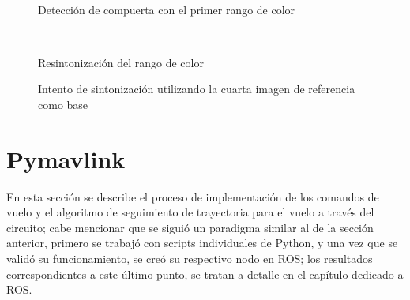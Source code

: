 \begin{figure}[ht]
    \centering
    \hfill
    \\
    \hfill
    \hfill

    \caption{Detección de compuerta con el primer rango de color}
    \label{fig:cv_gatesth1}
\end{figure}

\begin{figure}[ht]
    \centering
    \hfill
    \\
    \hfill
    \hfill

    \caption{Resintonización del rango de color}
    \label{fig:cv_gatesth2}
\end{figure}

\begin{figure}[ht]
    \centering
    \hfill

    \caption{Intento de sintonización utilizando la cuarta imagen de referencia como base}
    \label{fig:cv_gatesth3}
\end{figure}

\newpage

\section{Pymavlink}
En esta sección se describe el proceso de implementación de los comandos de vuelo y el algoritmo de seguimiento de trayectoria para el vuelo a través del circuito; cabe mencionar que se siguió un paradigma similar al de la sección anterior, primero se trabajó con scripts individuales de Python, y una vez que se validó su funcionamiento, se creó su respectivo nodo en ROS; los resultados correspondientes a este último punto, se tratan a detalle en el capítulo dedicado a ROS.

